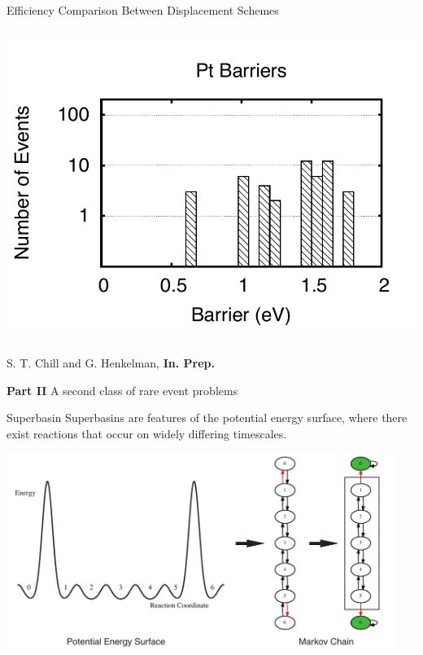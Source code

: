 \documentclass[onlymath]{beamer}
\begin{document}
\begin{frame}{Efficiency Comparison Between Displacement Schemes}
\begin{columns}
\begin{column}{0.4\textwidth}
\includegraphics[width=\columnwidth]{images/pt-barriers.pdf}

\end{column}
\end{columns}
\vspace{2mm}
{\tiny S. T. Chill and G. Henkelman, \textbf{In. Prep.}}

\end{frame}


\begin{frame}{\textbf{Part II} A second class of rare event problems}
  \begin{block}{Superbasin}
    Superbasins are features of the potential energy surface, where there exist reactions that occur on widely differing timescales.
  \end{block}

  \begin{center}
    \includegraphics[width=0.95\textwidth]{images/superbasin-and-graphs}
  \end{center}


\end{frame}
\end{document}
